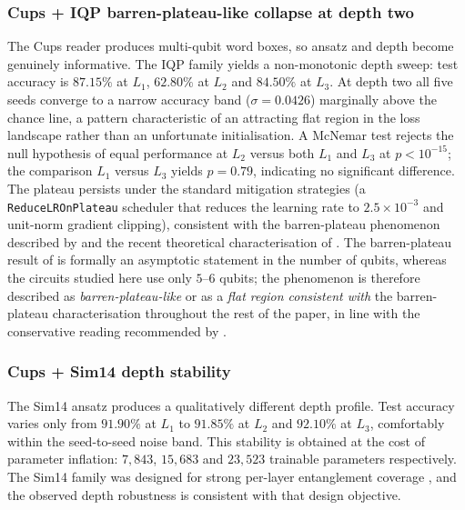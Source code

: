\documentclass[11pt, a4paper]{article}
\begin{document}
\subsubsection{Cups + IQP barren-plateau-like collapse at depth two}

The Cups reader produces multi-qubit word boxes, so ansatz and depth
become genuinely informative. The IQP family yields a non-monotonic
depth sweep: test accuracy is \(87.15\%\) at \(L_1\), \(62.80\%\) at
\(L_2\) and \(84.50\%\) at \(L_3\). At depth two all five seeds
converge to a narrow accuracy band (\(\sigma=0.0426\)) marginally
above the chance line, a pattern characteristic of an attracting flat
region in the loss landscape rather than an unfortunate
initialisation. A McNemar test rejects the null hypothesis of equal
performance at \(L_2\) versus both \(L_1\) and \(L_3\) at
\(p < 10^{-15}\); the comparison \(L_1\) versus \(L_3\) yields
\(p=0.79\), indicating no significant difference. The plateau persists
under the standard mitigation strategies (a
\texttt{ReduceLROnPlateau} scheduler that reduces the learning rate to
\(2.5 \times 10^{-3}\) and unit-norm gradient clipping), consistent
with the barren-plateau phenomenon described by \citet{mcclean2018}
and the recent theoretical characterisation of
\citet{ragone2024, larocca2025}. The barren-plateau result of
\citet{mcclean2018} is formally an asymptotic statement in the
number of qubits, whereas the circuits studied here use only
\(5\)--\(6\) qubits; the phenomenon is therefore described as
\emph{barren-plateau-like} or as a \emph{flat region consistent
with} the barren-plateau characterisation throughout the rest of
the paper, in line with the conservative reading recommended by
\citet{cerezo2022qml}.

\subsubsection{Cups + Sim14 depth stability}

The Sim14 ansatz produces a qualitatively different depth profile.
Test accuracy varies only from \(91.90\%\) at \(L_1\) to
\(91.85\%\) at \(L_2\) and \(92.10\%\) at \(L_3\), comfortably within
the seed-to-seed noise band. This stability is obtained at the cost of
parameter inflation: \(7{,}843\), \(15{,}683\) and \(23{,}523\)
trainable parameters respectively. The Sim14 family was designed for
strong per-layer entanglement coverage \citep{sim2019}, and the
observed depth robustness is consistent with that design objective.
\end{document}
